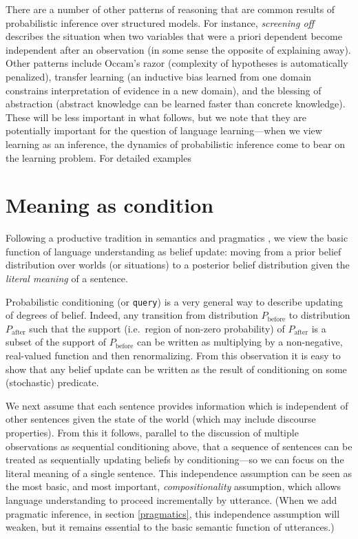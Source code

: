 \documentclass[pdfextras]{handbook}
\begin{document}
There are a number of other patterns of reasoning that are common results of probabilistic inference over structured models. 
For instance, \emph{screening off} describes the situation when two variables that were a priori dependent become independent after an observation (in some sense the opposite of explaining away).
Other patterns include Occam's razor (complexity of hypotheses is automatically penalized), transfer learning (an inductive bias learned from one domain constrains interpretation of evidence in a new domain), and the blessing of abstraction (abstract knowledge can be learned faster than concrete knowledge). 
These will be less important in what follows, but we note that they are potentially important for the question of language learning---when we view learning as an inference, the dynamics of probabilistic inference come to bear on the learning problem. For detailed examples 

 
\section{Meaning as condition}
\label{literal}
\label{literal-listener}

Following a productive tradition in semantics and pragmatics \citep[][etc.]{stalnaker78,lewis79,heim82}, we view the basic function of language understanding as belief update: moving from a prior belief distribution over worlds (or situations) to a posterior belief distribution given the \emph{literal meaning} of a sentence. 

Probabilistic conditioning (or \lstinline{query}) is a very general way to describe updating of degrees of belief. Indeed, any transition from distribution $P_{\text{before}}$ to distribution $P_{\text{after}}$ such that the support (i.e.\ region of non-zero probability) of $P_{\text{after}}$ is a subset of the support of $P_{\text{before}}$ can be written as multiplying by a non-negative, real-valued function and then renormalizing. From this observation it is easy to show that any belief update can be written as the result of conditioning on some (stochastic) predicate.

We next assume that each sentence provides information which is independent of other sentences given the state of the world (which may include discourse properties). From this it follows, parallel to the discussion of multiple observations as sequential conditioning above, that a sequence of sentences can be treated as sequentially updating beliefs by conditioning---so we can focus on the literal meaning of a single sentence. This independence assumption can be seen as the most basic, and most important, \emph{compositionality} assumption, which allows language understanding to proceed incrementally by utterance. (When we add pragmatic inference, in section \ref{pragmatics}, this independence assumption will weaken, but it remains essential to the basic semantic function of utterances.)
\end{document}

